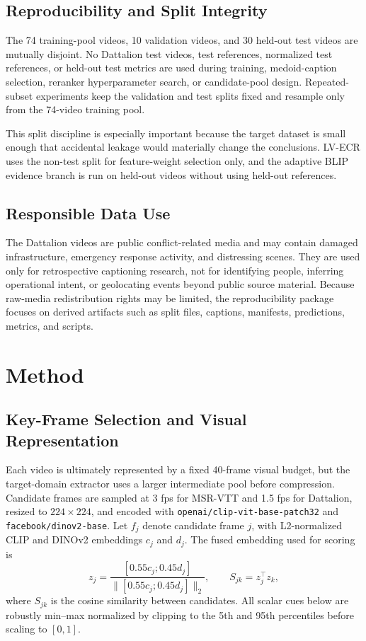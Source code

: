 \documentclass[pdflatex,sn-mathphys-num]{sn-jnl}
\theoremstyle{thmstyleone}
\theoremstyle{thmstyletwo}
\theoremstyle{thmstylethree}
\begin{document}
\subsection{Reproducibility and Split Integrity}
The 74 training-pool videos, 10 validation videos, and 30 held-out test videos are mutually disjoint. No Dattalion test videos, test references, normalized test references, or held-out test metrics are used during training, medoid-caption selection, reranker hyperparameter search, or candidate-pool design. Repeated-subset experiments keep the validation and test splits fixed and resample only from the 74-video training pool.

This split discipline is especially important because the target dataset is small enough that accidental leakage would materially change the conclusions. LV-ECR uses the non-test split for feature-weight selection only, and the adaptive BLIP evidence branch is run on held-out videos without using held-out references.

\subsection{Responsible Data Use}
The Dattalion videos are public conflict-related media and may contain damaged infrastructure, emergency response activity, and distressing scenes. They are used only for retrospective captioning research, not for identifying people, inferring operational intent, or geolocating events beyond public source material. Because raw-media redistribution rights may be limited, the reproducibility package focuses on derived artifacts such as split files, captions, manifests, predictions, metrics, and scripts.

\section{Method}\label{sec4}
\subsection{Key-Frame Selection and Visual Representation}
Each video is ultimately represented by a fixed 40-frame visual budget, but the target-domain extractor uses a larger intermediate pool before compression. Candidate frames are sampled at 3 fps for MSR-VTT and 1.5 fps for Dattalion, resized to $224 \times 224$, and encoded with \texttt{openai/clip-vit-base-patch32} and \texttt{facebook/dinov2-base}. Let $f_j$ denote candidate frame $j$, with L2-normalized CLIP and DINOv2 embeddings $c_j$ and $d_j$. The fused embedding used for scoring is
\[
    z_j =
    \frac{[0.55c_j;0.45d_j]}
    {\lVert [0.55c_j;0.45d_j]\rVert_2},
    \qquad
    S_{jk}=z_j^\top z_k ,
\]
where $S_{jk}$ is the cosine similarity between candidates. All scalar cues below are robustly min--max normalized by clipping to the 5th and 95th percentiles before scaling to $[0,1]$.
\end{document}

